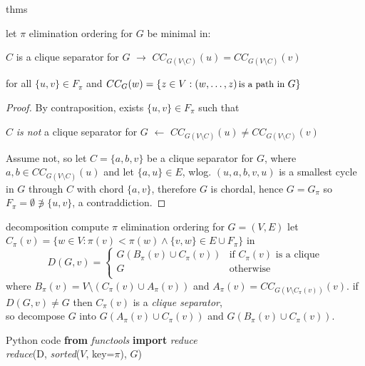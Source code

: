 \documentclass{beamer}
\begin{document}
\begin{frame}{thms}
\begin{theorem}
let $\pi$ elimination ordering for $G$ be minimal in: 
\begin{center}
$C$ is a clique separator for $G$ $\rightarrow$ $CC_{G(V\setminus C)}(u) =
CC_{G(V\setminus C)}(v)$
\end{center}
for all $ \lbrace u, v \rbrace \in F_{\pi}$ and $CC_{G}(w)= \lbrace z\in V:
    (w,\ldots,z) \text{\small\,is a path in } G \rbrace$
\end{theorem}
\begin{proof}
By contraposition, exists $ \lbrace u, v \rbrace\in F_{\pi}$ such that
\begin{center}
$C$ \textit{is not} a clique separator for $G$ $\leftarrow$ $CC_{G(V\setminus C)}(u)\neq 
CC_{G(V\setminus C)}(v)$
\end{center}
Assume not, so let $C= \lbrace a, b, v \rbrace$ be a clique separator for $G$,
where $a, b\in CC_{G(V\setminus C)}(u)$ and let $ \lbrace a, u \rbrace\in E$, wlog.
$(u, a, b, v, u)$ is a smallest cycle in $G$ through $C$ with chord $ \lbrace a, v \rbrace$, 
therefore $G$ is chordal, hence $G=G_{\pi}$ so $F_{\pi}=\emptyset \not\ni \lbrace u, v \rbrace$,
a contraddiction.
\end{proof}
\end{frame}

\begin{frame}{decomposition}
compute $\pi$ elimination ordering for $G=(V, E)$
\vfill
let $C_{\pi}(v) =  \lbrace w \in V : \pi(v) < \pi(w) \wedge  \lbrace v, w \rbrace \in E\cup F_{\pi} \rbrace$ in
$$D(G, v) = \left\lbrace\begin{array}{ll}
            G(B_{\pi}(v)\cup C_{\pi}(v)) & \text{if } C_{\pi}(v) \text{ is a clique}\\
            G & \text{otherwise} \\
           \end{array}\right.$$
where $B_{\pi}(v) = V\setminus \left(C_{\pi}(v)\cup A_{\pi}(v)\right)$
and $A_{\pi}(v) = CC_{G\left(V\setminus C_{\pi}(v)\right)}(v)$.
\vfill
if $D(G, v) \neq G$ then  $C_{\pi}(v)$ is a \emph{clique separator},\\
so decompose $G$ into $G(A_{\pi}(v) \cup C_{\pi}(v))$ and $G(B_{\pi}(v) \cup C_{\pi}(v))$.
\vfill
\begin{block}{Python code}
\textbf{from} \textit{functools} \textbf{import} \textit{reduce}\\
\textit{reduce}(D, \textit{sorted}($V$, key=$\pi$), $G$)
\end{block}
\end{frame}
\end{document}

